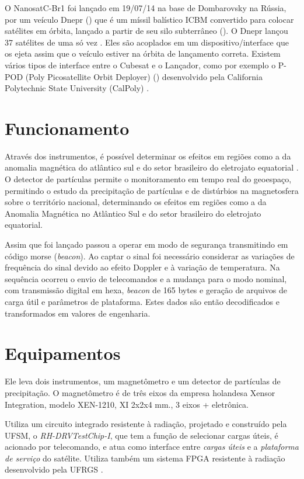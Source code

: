 O NanosatC-Br1 foi lançado em 19/07/14 na base de Dombarovsky na Rússia, por um veículo Dnepr () que é um míssil balístico ICBM convertido para colocar satélites em órbita, lançado a partir de seu silo subterrâneo (). O Dnepr lançou 37 satélites de uma só vez \cite{Graham2014}. Eles são acoplados em um dispositivo/interface que os ejeta assim que o veículo estiver na órbita de lançamento correta. Existem vários tipos de interface entre o Cubesat e o Lançador, como por exemplo o P-POD (Poly Picosatellite Orbit Deployer) ()
desenvolvido pela California Polytechnic State University (CalPoly) \cite{Burger2009}.


\section{Funcionamento}

Através dos instrumentos, é possível determinar os efeitos em regiões como a da anomalia magnética do atlântico sul e do setor brasileiro do eletrojato equatorial \cite{UFSM2014}. O detector de partículas permite o monitoramento em tempo real do geoespaço, permitindo o estudo da precipitação de partículas e de distúrbios na magnetosfera sobre o território nacional, determinando os efeitos em regiões como a da Anomalia Magnética no Atlântico Sul e do setor brasileiro do eletrojato equatorial.

Assim que foi lançado passou a operar em modo de segurança transmitindo em código morse (\textit{beacon}). Ao captar o sinal foi necessário considerar as variações de frequência do sinal devido ao efeito Doppler e à variação de temperatura. Na sequência ocorreu o envio de telecomandos e a mudança para o modo nominal, com transmissão digital em hexa, \textit{beacon} de 165 bytes e geração de arquivos de carga útil e parâmetros de plataforma. Estes dados são então decodificados e transformados em valores de engenharia.
\cite{Durao2016}

\section{Equipamentos} %

Ele leva dois instrumentos, um magnetômetro e um detector de partículas de precipitação. O magnetômetro é de três eixos da empresa holandesa Xensor Integration, modelo XEN-1210, XI 2x2x4 mm., 3 eixos + eletrônica.

Utiliza um circuito integrado resistente à radiação, projetado e construído pela UFSM, o \emph{RH-DRVTestChip-I}, que tem a função de selecionar cargas úteis, é acionado por telecomando, e atua como interface entre \emph{cargas úteis} e a \emph{plataforma de serviço} do satélite. Utiliza também um sistema FPGA resistente à radiação desenvolvido pela UFRGS \cite{Nano2018}.

